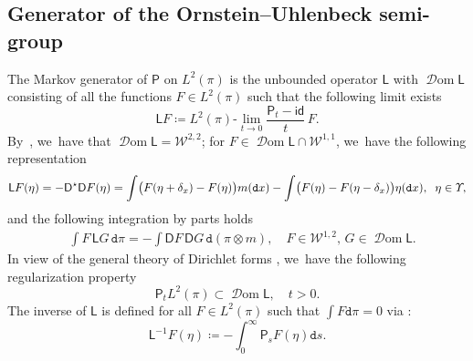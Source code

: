 \documentclass[10pt]{amsart}
\theoremstyle{definition}
\theoremstyle{remark}
\DeclarePairedDelimiter{\paren}{\lparen}{\rparen}
\DeclareMathOperator{\dom}{\mathscr{D}om}
\begin{document}
\subsection{Generator of the Ornstein--Uhlenbeck semi-group}

The Markov generator of $\mathsf{P}$ on $L^{2}(\pi)$ is the unbounded operator $\mathsf{L}$ with $\dom \mathsf{L}$ consisting of all the functions $F \in L^{2}(\pi)$ such that the following limit exists
\begin{equation*}
\mathsf{L} F \coloneq L^{2}(\pi)\text{-}\lim_{t \to 0} \frac{\mathsf{P}_{t} - \mathsf{id}}{t}\, F.
\end{equation*}
By~\cite[Props.\,3 \& 4 and Th.\,5]{LastAnaSto}, we~have that $\dom \mathsf{L} = \mathscr{W}^{2,2}$; for $F \in \dom{\mathsf{L}} \cap \mathscr{W}^{1,1}$, we~have the following representation
\begin{equation*}
\mathsf{L} F(\eta) = - \mathsf{D}^{\star} \mathsf{D} F(\eta) = \int \paren[\big]{F(\eta + \delta_{x}) - F(\eta)} m(\mathtt{d} x) - \int \paren[\big]{F(\eta) - F(\eta - \delta_{x})} \eta(\mathtt{d} x), \;\; \eta \in \varUpsilon,
\end{equation*}
and the following integration by parts holds
\begin{align}
& \label{e:ou-ipp-generator} \int F\, \mathsf{L} G\, \mathtt{d} \pi = - \int \mathsf{D} F\, \mathsf{D} G\, \mathtt{d}(\pi \otimes m), \quad F \in \mathscr{W}^{1,2},\, G \in \dom \mathsf{L}.
\end{align}
In view of the general theory of Dirichlet forms \cite[Th.\,2.20]{MaRockner}, we~have the following regularization property
\begin{equation}\label{e:ou-regularization-L2}
\mathsf{P}_{t} L^{2}(\pi) \subset \dom \mathsf{L}, \quad t > 0.
\end{equation}
The inverse of $\mathsf{L}$ is defined for all $F \in L^{2}(\pi)$ such that $\int F \mathtt{d} \pi = 0$ via \cite[Th.\,7]{LastAnaSto}:
\begin{equation*}
\mathsf{L}^{-1} F(\eta) \coloneq - \int_{0}^{\infty} \mathsf{P}_{s} F(\eta) \mathtt{d} s.
\end{equation*}
\end{document}
